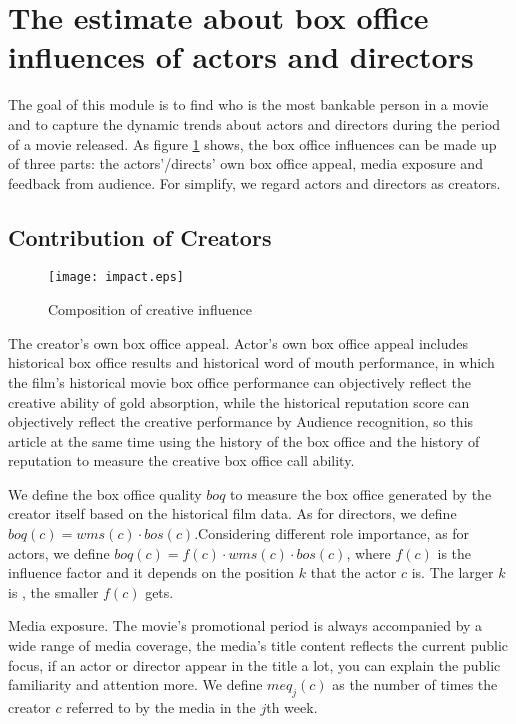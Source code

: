 \section{The estimate about box office influences of actors and directors}
\label{sec:impact}
\par The goal of this module is to find who is the most bankable person in a movie and to capture the dynamic trends about actors and directors during the period of a movie released. As figure \ref{fig:influ} shows, the box office influences can be made up of three parts: the actors'/directs' own box office appeal, media exposure and feedback from audience. For simplify, we regard actors and directors as creators.

\subsection{Contribution of Creators}
\begin{figure}[!htbp]
\centering
\texttt{[image: impact.eps]}
\caption{Composition of creative influence}
\label{fig:influ}
\end{figure}
\par The creator's own box office appeal. Actor's own box office appeal includes historical box office results and historical word of mouth performance, in which the film's historical movie box office performance can objectively reflect the creative ability of gold absorption, while the historical reputation score can objectively reflect the creative performance by Audience recognition, so this article at the same time using the history of the box office and the history of reputation to measure the creative box office call ability.\\
\par We define the box office quality $boq$ to measure the box office generated by the creator itself based on the historical film data. 
As for directors, we define $boq(c)=wms(c)\cdot bos(c)$.Considering different role importance, as for actors, we define $boq(c) = f(c)\cdot wms(c)\cdot bos(c)$, where $f(c)$ is the influence factor and it depends on the position $k$ that the actor $c$ is. The larger $k$ is , the smaller $f(c)$ gets.\\
\par Media exposure. The movie's promotional period is always accompanied by a wide range of media coverage, the media's title content reflects the current public focus, if an actor or director appear in the title a lot, you can explain the public familiarity and attention more. We define $meq_j(c)$ as the number of times the creator $c$ referred to by the media in the $j$th week.\\
